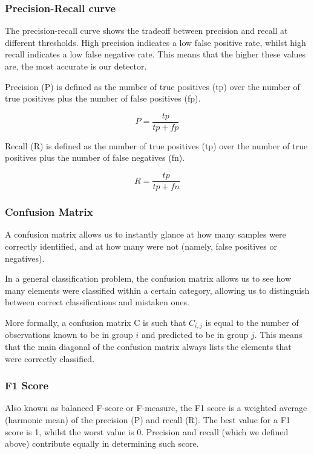 \documentclass[]{project_plan}
\begin{document}
\subsubsection{Precision-Recall curve}

The precision-recall curve shows the tradeoff between precision and recall at
different thresholds. High precision indicates a low false positive rate, whilst
high recall indicates a low false negative rate. This means that the higher these
values are, the most accurate is our detector.

Precision (P) is defined as the number of true positives (tp) over the
number of true positives plus the number of false positives (fp).

\[
  P = \frac{tp}{tp + fp}
\]

Recall (R) is defined as the number of true positives (tp) over the number
of true positives plus the number of false negatives (fn).

\[
  R = \frac{tp}{tp + fn}
\]


\subsubsection{Confusion Matrix}

A confusion matrix allows us to instantly glance at how many samples were
correctly identified, and at how many were not (namely, false positives or
negatives).

In a general classification problem, the confusion matrix allows us to
see how many elements were classified within a certain category, allowing us to
distinguish between correct classifications and mistaken ones.

More formally, a confusion matrix C is such that $C_{i,j}$ is equal to the number
of observations known to be in group $i$ and predicted to be in group $j$. This
means that the main diagonal of the confusion matrix always lists the elements
that were correctly classified.

\subsubsection{F1 Score}

Also known as balanced F-score or F-measure, the F1 score is a weighted average
(harmonic mean) of the precision (P) and recall (R). The best value for a F1
score is 1, whilst the worst value is 0. Precision and recall (which we defined
above) contribute equally in determining such score.
\end{document}
